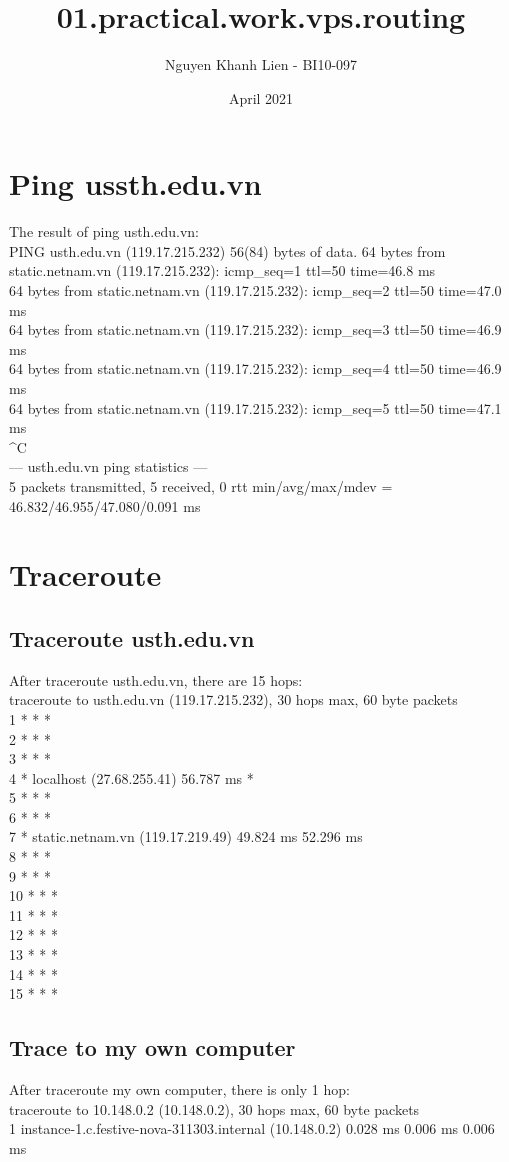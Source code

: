 \documentclass{article}
\title{01.practical.work.vps.routing}
\author{Nguyen Khanh Lien - BI10-097}
\date{April 2021}
\begin{document}
\maketitle

\section{Ping ussth.edu.vn}
\hspace{20}The result of ping usth.edu.vn:\\
PING usth.edu.vn (119.17.215.232) 56(84) bytes of data.
64 bytes from static.netnam.vn (119.17.215.232): icmp_seq=1 ttl=50 time=46.8 ms\\
64 bytes from static.netnam.vn (119.17.215.232): icmp_seq=2 ttl=50 time=47.0 ms\\
64 bytes from static.netnam.vn (119.17.215.232): icmp_seq=3 ttl=50 time=46.9 ms\\
64 bytes from static.netnam.vn (119.17.215.232): icmp_seq=4 ttl=50 time=46.9 ms\\
64 bytes from static.netnam.vn (119.17.215.232): icmp_seq=5 ttl=50 time=47.1 ms\\
^C\\
--- usth.edu.vn ping statistics ---\\
5 packets transmitted, 5 received, 0%
rtt min/avg/max/mdev = 46.832/46.955/47.080/0.091 ms\\

\section{Traceroute}
\subsection{Traceroute usth.edu.vn}
\hspace{20}After traceroute usth.edu.vn, there are 15 hops:\\
traceroute to usth.edu.vn (119.17.215.232), 30 hops max, 60 byte packets\\
 1  * * *\\
 2  * * *\\
 3  * * *\\
 4  * localhost (27.68.255.41)  56.787 ms *\\
 5  * * *\\
 6  * * *\\
 7  * static.netnam.vn (119.17.219.49)  49.824 ms  52.296 ms\\
 8  * * *\\
 9  * * *\\
10  * * *\\
11  * * *\\
12  * * *\\
13  * * *\\
14  * * *\\
15  * * *\\

\subsection{Trace to my own computer}
\hspace{20}After traceroute my own computer, there is only 1 hop:\\
traceroute to 10.148.0.2 (10.148.0.2), 30 hops max, 60 byte packets\\
 1  instance-1.c.festive-nova-311303.internal (10.148.0.2)  0.028 ms  0.006 ms  0.006 ms\\
\end{document}
